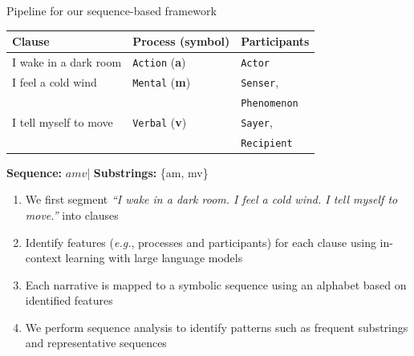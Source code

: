 \documentclass[10pt]{beamer}
\begin{document}
\begin{frame}{Pipeline for our sequence-based framework}


\begin{table}[!ht]
  \centering
  \small
  \renewcommand{\arraystretch}{1.1}
  \begin{threeparttable}
    \label{tab:example}
    \begin{tabular}{lll}
      \textbf{Clause} & \textbf{Process (symbol)} & \textbf{Participants} \\
      \midrule
      I wake in a dark room         & \texttt{Action} (\textbf{a})  & \texttt{Actor} \\
      I feel a cold wind            & \texttt{Mental} (\textbf{m})  & \texttt{Senser},\\
                                            &             & \texttt{Phenomenon} \\
      I tell myself to move         & \texttt{Verbal} (\textbf{v})  & \texttt{Sayer},\\
                                            &             & \texttt{Recipient} \\
      \bottomrule
    \end{tabular}

    \begin{tablenotes}[flushleft]
      \footnotesize
      \item \textbf{Sequence:} $amv$\quad|\quad
            \textbf{Substrings:} \{am, mv\}
    \end{tablenotes}
  \end{threeparttable}
\end{table}

\pause

\begin{enumerate}[<+->]
    \item We first segment \textit{“I wake in a dark room. I feel a cold wind. I tell myself to move.”} into clauses
    \item Identify features (\textit{e.g.}, processes and participants) for each clause using in-context learning with large language models
    \item Each narrative is mapped to a symbolic sequence using an alphabet based on identified features
    \item We perform sequence analysis to identify patterns such as frequent substrings and representative sequences
\end{enumerate}
    
\end{frame}
\end{document}
